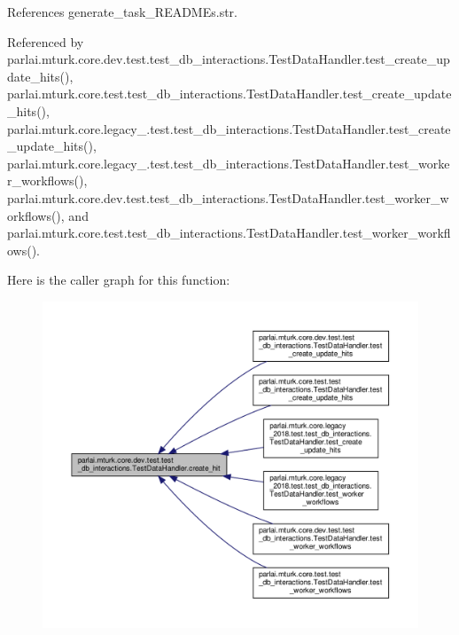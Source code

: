 References generate\+\_\+task\+\_\+\+R\+E\+A\+D\+M\+Es.\+str.



Referenced by parlai.\+mturk.\+core.\+dev.\+test.\+test\+\_\+db\+\_\+interactions.\+Test\+Data\+Handler.\+test\+\_\+create\+\_\+update\+\_\+hits(), parlai.\+mturk.\+core.\+test.\+test\+\_\+db\+\_\+interactions.\+Test\+Data\+Handler.\+test\+\_\+create\+\_\+update\+\_\+hits(), parlai.\+mturk.\+core.\+legacy\+\_.\+test.\+test\+\_\+db\+\_\+interactions.\+Test\+Data\+Handler.\+test\+\_\+create\+\_\+update\+\_\+hits(), parlai.\+mturk.\+core.\+legacy\+\_.\+test.\+test\+\_\+db\+\_\+interactions.\+Test\+Data\+Handler.\+test\+\_\+worker\+\_\+workflows(), parlai.\+mturk.\+core.\+dev.\+test.\+test\+\_\+db\+\_\+interactions.\+Test\+Data\+Handler.\+test\+\_\+worker\+\_\+workflows(), and parlai.\+mturk.\+core.\+test.\+test\+\_\+db\+\_\+interactions.\+Test\+Data\+Handler.\+test\+\_\+worker\+\_\+workflows().

Here is the caller graph for this function\+:
\nopagebreak
\begin{figure}[H]
\begin{center}
\leavevmode
\includegraphics[width=350pt]{classparlai_1_1mturk_1_1core_1_1dev_1_1test_1_1test__db__interactions_1_1TestDataHandler_a9b8412813e505af83e8fa3b27baa6c6e_icgraph}
\end{center}
\end{figure}
\mbox{\label{classparlai_1_1mturk_1_1core_1_1dev_1_1test_1_1test__db__interactions_1_1TestDataHandler_ac02ba3d2424a8f439407b11a9d920522}} 
